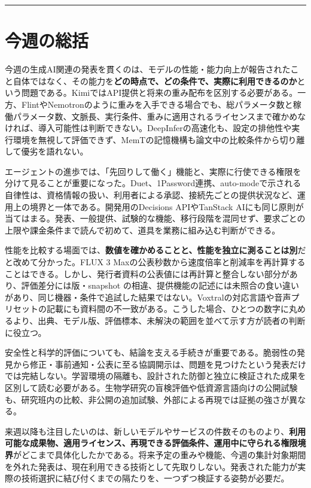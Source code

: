 \documentclass[lualatex,a4paper,10pt]{jlreq}
\begin{document}
\bigskip\hrule\bigskip


\section*{今週の総括}
\label{sec:recap}
\bigskip


今週の生成AI関連の発表を貫くのは、モデルの性能・能力向上が報告されたこと自体ではなく、その能力を\textbf{どの時点で、どの条件で、実際に利用できるのか}という問題である。KimiではAPI提供と将来の重み配布を区別する必要がある。一方、FlintやNemotronのように重みを入手できる場合でも、総パラメータ数と稼働パラメータ数、文脈長、実行条件、重みに適用されるライセンスまで確かめなければ、導入可能性は判断できない。DeepInferの高速化も、設定の排他性や実行環境を無視して評価できず、MemTの記憶機構も論文中の比較条件から切り離して優劣を語れない。


エージェントの進歩では、「先回りして働く」機能と、実際に行使できる権限を分けて見ることが重要になった。Duet、1Password連携、auto-modeで示される自律性は、資格情報の扱い、利用者による承認、接続先ごとの提供状況など、運用上の境界と一体である。開発用のDecisions APIやTanStack AIにも同じ原則が当てはまる。発表、一般提供、試験的な機能、移行段階を混同せず、要求ごとの上限や課金条件まで読んで初めて、道具を業務に組み込む判断ができる。


性能を比較する場面では、\textbf{数値を確かめることと、性能を独立に測ることは別}だと改めて分かった。FLUX 3 Maxの公表秒数から速度倍率と削減率を再計算することはできる。しかし、発行者資料の公表値には再計算と整合しない部分があり、評価差分には版・snapshot の相違、提供機能の記述には未照合の食い違いがあり、同じ機器・条件で追試した結果ではない。Voxtralの対応言語や音声プリセットの記載にも資料間の不一致がある。こうした場合、ひとつの数字に丸めるより、出典、モデル版、評価標本、未解決の範囲を並べて示す方が読者の判断に役立つ。


安全性と科学的評価についても、結論を支える手続きが重要である。脆弱性の発見から修正・事前通知・公表に至る協調開示は、問題を見つけたという発表だけでは完結しない。学習環境の隔離も、設計された防御と独立に検証された成果を区別して読む必要がある。生物学研究の盲検評価や低資源言語向けの公開試験も、研究班内の比較、非公開の追加試験、外部による再現では証拠の強さが異なる。


来週以降も注目したいのは、新しいモデルやサービスの件数そのものより、\textbf{利用可能な成果物、適用ライセンス、再現できる評価条件、運用中に守られる権限境界}がどこまで具体化したかである。将来予定の重みや機能、今週の集計対象期間を外れた発表は、現在利用できる技術として先取りしない。発表された能力が実際の技術選択に結び付くまでの隔たりを、一つずつ検証する姿勢が必要だ。
\end{document}
